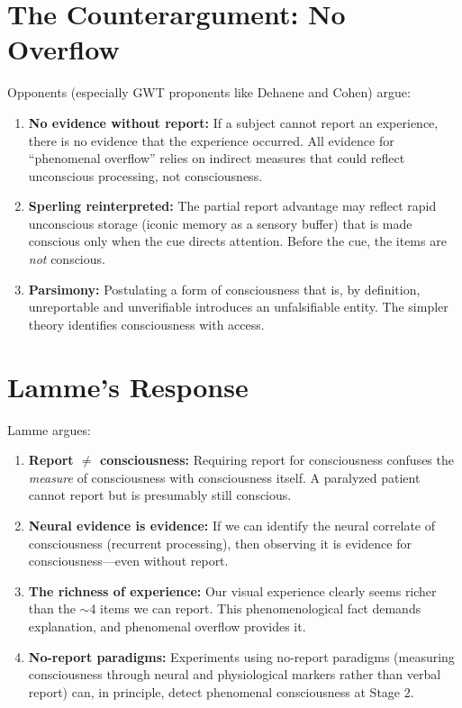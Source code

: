 \documentclass[11pt,a4paper]{report}
\begin{document}
\section{The Counterargument: No Overflow}

Opponents (especially GWT proponents like Dehaene and Cohen) argue:

\begin{compbox}
\begin{enumerate}[leftmargin=1.5em]
  \item \textbf{No evidence without report:} If a subject cannot report an experience, there is no evidence that the experience occurred. All evidence for ``phenomenal overflow'' relies on indirect measures that could reflect unconscious processing, not consciousness.
  \item \textbf{Sperling reinterpreted:} The partial report advantage may reflect rapid unconscious storage (iconic memory as a sensory buffer) that is made conscious only when the cue directs attention. Before the cue, the items are \emph{not} conscious.
  \item \textbf{Parsimony:} Postulating a form of consciousness that is, by definition, unreportable and unverifiable introduces an unfalsifiable entity. The simpler theory identifies consciousness with access.
\end{enumerate}
\end{compbox}

\section{Lamme's Response}

Lamme argues:

\begin{enumerate}[leftmargin=2em]
  \item \textbf{Report $\neq$ consciousness:} Requiring report for consciousness confuses the \emph{measure} of consciousness with consciousness itself. A paralyzed patient cannot report but is presumably still conscious.
  \item \textbf{Neural evidence is evidence:} If we can identify the neural correlate of consciousness (recurrent processing), then observing it is evidence for consciousness---even without report.
  \item \textbf{The richness of experience:} Our visual experience clearly seems richer than the $\sim$4 items we can report. This phenomenological fact demands explanation, and phenomenal overflow provides it.
  \item \textbf{No-report paradigms:} Experiments using no-report paradigms (measuring consciousness through neural and physiological markers rather than verbal report) can, in principle, detect phenomenal consciousness at Stage 2.
\end{enumerate}
\end{document}
